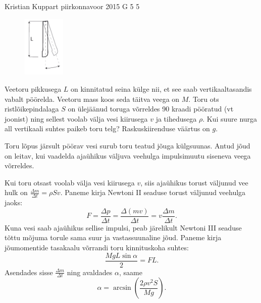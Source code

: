 {Kristian Kuppart} %
{piirkonnavoor} %
{2015} %
{G 5} %
{5} %
{
\ifStatement
\begin{figure}
  \vspace{-30pt}
  \begin{center}
    \includegraphics[width=0.18\textwidth]{2015-v2g-05-toru}
  \end{center}
\end{figure}
Veetoru pikkusega $L$ on kinnitatud seina külge nii, et see saab vertikaaltasandis vabalt pöörelda. Veetoru mass koos seda täitva veega on $M$. Toru ots ristlõikepindalaga $S$ on ülejäänud toruga võrreldes \num{90} kraadi pööratud (vt joonist) ning sellest voolab välja vesi kiirusega $v$ ja tihedusega $\rho$. Kui suure nurga all vertikaali suhtes paikeb toru telg? Raskuskiirenduse väärtus on $g$.
\pagebreak
\fi


\ifHint
Toru lõpus järsult pöörav vesi surub toru teatud jõuga külgsuunas. Antud jõud on leitav, kui vaadelda ajaühikus väljuva veehulga impulsimuutu siseneva veega võrreldes.
\fi


\ifSolution
Kui toru otsast voolab välja vesi kiirusega $v$, siis ajaühikus torust väljunud vee hulk on $\frac{\Delta m}{\Delta t}=\rho S v$. Paneme kirja Newtoni II seaduse torust väljunud veehulga jaoks: 
\[ F=\frac{\Delta p}{\Delta t}=\frac{\Delta(mv)}{\Delta t}=v \frac{\Delta m}{\Delta t}. \]
Kuna vesi saab ajaühikus sellise impulsi, peab järelikult Newtoni III seaduse tõttu mõjuma torule sama suur ja vastassuunaline jõud. Paneme kirja jõumomentide tasakaalu võrrandi toru kinnituskoha suhtes: 
\[ \frac{MgL\sin \alpha}{2}=FL. \]
Asendades sisse $\frac{\Delta m}{\Delta t}$ ning avaldades $\alpha$, saame
\[ \alpha=\arcsin (\frac{2\rho v^2 S}{Mg}). \]
\fi


}
